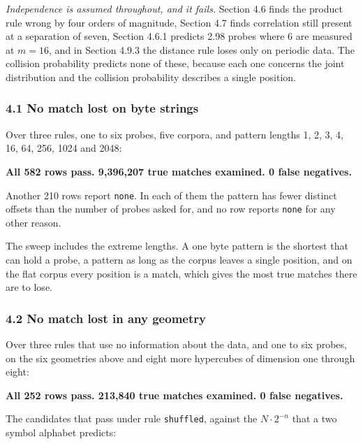 \noindent\emph{Independence is assumed throughout, and it fails.} Section 4.6 finds the product rule wrong by four orders of magnitude, Section 4.7 finds correlation still present at a separation of seven, Section 4.6.1 predicts 2.98 probes where 6 are measured at \(m = 16\), and in Section 4.9.3 the distance rule loses only on periodic data. The collision probability predicts none of these, because each one concerns the joint distribution and the collision probability describes a single position.

\subsubsection{4.1 No match lost on byte strings}

Over three rules, one to six probes, five corpora, and pattern lengths 1, 2, 3, 4, 16, 64, 256, 1024 and 2048:

\noindent\textbf{All 582 rows pass. 9,396,207 true matches examined. 0 false negatives.}

Another 210 rows report \texttt{none}. In each of them the pattern has fewer distinct offsets than the number of probes asked for, and no row reports \texttt{none} for any other reason.

The sweep includes the extreme lengths. A one byte pattern is the shortest that can hold a probe, a pattern as long as the corpus leaves a single position, and on the flat corpus every position is a match, which gives the most true matches there are to lose.

\subsubsection{4.2 No match lost in any geometry}

Over three rules that use no information about the data, and one to six probes, on the six geometries above and eight more hypercubes of dimension one through eight:

\noindent\textbf{All 252 rows pass. 213,840 true matches examined. 0 false negatives.}

The candidates that pass under rule \texttt{shuffled}, against the \(N \cdot 2^{-n}\) that a two symbol alphabet predicts:

